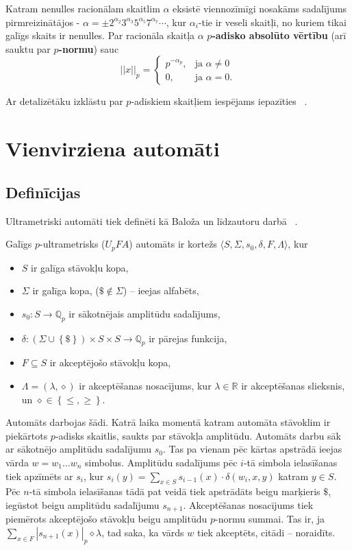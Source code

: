 \documentclass{ludis}
\begin{document}
\begin{definicija}
Katram nenulles racionālam skaitlim $\alpha$ eksistē viennozīmīgi nosakāms sadalījums pirmreizinātājos - $\alpha = \pm 2^{\alpha_2}3^{\alpha_3}5^{\alpha_5}7^{\alpha_7} \cdots$, kur $\alpha_i$-tie ir veseli skaitļi, no kuriem tikai galīgs skaits ir nenulles. Par racionāla skaitļa $\alpha$ \textbf{$p$-adisko absolūto vērtību} (arī sauktu par \textbf{$p$-normu}) sauc 
\[
||x||_p = \begin{cases}
p^{-\alpha_p}, &\textrm{ja } \alpha \neq 0 \\
0, &\textrm{ja } \alpha = 0.
\end{cases}
\]
\end{definicija}

Ar detalizētāku izklāstu par $p$-adiskiem skaitļiem iespējams iepazīties ~\citep{Madore}.

\chapter{Vienvirziena automāti}
\section{Definīcijas}
Ultrametriski automāti tiek definēti kā Baloža un līdzautoru darbā ~\citep{KasparsBalodis2013}.
\begin{definicija}
Galīgs $p$-ultrametrisks ($U_pFA$) automāts ir kortežs $\langle S, \Sigma, s_0, \delta, F, \Lambda \rangle$, kur
\begin{itemize}
  \item $S$ ir galīga stāvokļu kopa,
  \item $\Sigma$ ir galīga kopa, ($\$ \notin \Sigma$) -- ieejas alfabēts,
  \item $s_0:S \rightarrow \mathbb{Q}_p$ ir sākotnējais amplitūdu sadalījums, %
  \item $\delta: \left( \Sigma \cup \left\{ \$ \right\} \right) \times S \times S \rightarrow \mathbb{Q}_p$ ir pārejas funkcija,
  \item $F \subseteq S$ ir akceptējošo stāvokļu kopa,
  \item $\Lambda = \left( \lambda, \diamond \right)$ ir akceptēšanas nosacījums, kur $\lambda \in \mathbb{R}$ ir akceptēšanas slieksnis, un $\diamond \in \left\{ \leq, \geq \right\}$.
\end{itemize}
Automāts darbojas šādi.
Katrā laika momentā katram automāta stāvoklim ir piekārtots $p$-adisks skaitlis, saukts par stāvokļa amplitūdu.
Automāts darbu sāk ar sākotnējo amplitūdu sadalījumu $s_0$.
Tas pa vienam pēc kārtas apstrādā ieejas vārda $w = w_1 \ldots w_n$ simbolus.
Amplitūdu sadalījums pēc $i$-tā simbola ielasīšanas tiek apzīmēts ar $s_i$, kur
$s_i(y) = \sum_{x \in S}{s_{i-1}(x) \cdot \delta \left( w_i, x, y \right) }$ katram $y \in S$.
Pēc $n$-tā simbola ielasīšanas tādā pat veidā tiek apstrādāts beigu marķieris $\$$, iegūstot beigu amplitūdu sadalījumu $s_{n+1}$.
Akceptēšanas nosacījums tiek piemērots akceptējošo stāvokļu beigu amplitūdu $p$-normu summai. Tas ir, ja $\sum_{x \in F}{\left| s_{n+1}(x) \right|_p} \diamond \lambda$, tad saka, ka vārds $w$ tiek akceptēts, citādi -- noraidīts.
\end{definicija}
\end{document}
